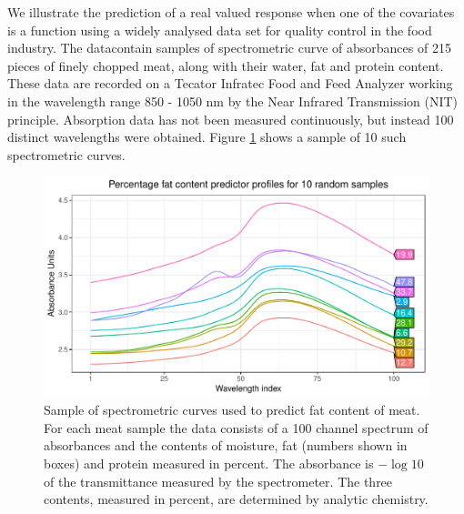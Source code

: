 \documentclass[a4paper,showframe,11pt]{report}\usepackage[]{graphicx}\usepackage[]{color}
\newenvironment{knitrout}{}{} %
\begin{document}
We illustrate the prediction of a real valued response when one of the covariates is a function using a widely analysed data set for quality control in the food industry. The data\footnotemark contain samples of spectrometric curve of absorbances of 215 pieces of finely chopped meat, along with their water, fat and protein content. These data are recorded on a Tecator Infratec Food and Feed Analyzer working in the wavelength range 850 - 1050 nm by the Near Infrared Transmission (NIT) principle. Absorption data has not been measured continuously, but instead 100 distinct wavelengths were obtained. Figure \ref{fig:tecator_data} shows a sample of 10 such spectrometric curves.


\begin{knitrout}
\color{fgcolor}\begin{figure}[h]

{\centering \includegraphics[width=0.9\linewidth]{figure/tecator_data-1} 

}

\caption[Sample of spectrometric curves used to predict fat content of meat]{Sample of spectrometric curves used to predict fat content of meat. For each meat sample the data consists of a 100 channel spectrum of absorbances and the contents of moisture, fat (numbers shown in boxes) and protein measured in percent. The absorbance is $- \log 10$ of the transmittance measured by the spectrometer. The three contents, measured in percent, are determined by analytic chemistry.}\label{fig:tecator_data}
\end{figure}


\end{knitrout}
\end{document}
